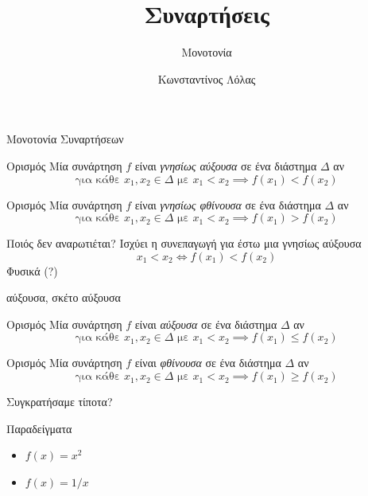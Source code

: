 \documentclass{presentation}
\title{Συναρτήσεις}
\subtitle{Μονοτονία}
\author[Λόλας]{Κωνσταντίνος Λόλας}
\begin{document}
\begin{frame}
  \titlepage
\end{frame}
\begin{frame}{Μονοτονία Συναρτήσεων}
  \begin{block}{Ορισμός}
    Μία συνάρτηση $f$ είναι \emph{γνησίως αύξουσα} σε ένα διάστημα $Δ$ αν
    $$\text{για κάθε } x_1,x_2\in Δ \text{ με } x_1<x_2\implies f(x_1)<f(x_2)$$
  \end{block} \pause
  \begin{block}{Ορισμός}
    Μία συνάρτηση $f$ είναι \emph{γνησίως φθίνουσα} σε ένα διάστημα $Δ$ αν
    $$\text{για κάθε } x_1,x_2\in Δ \text{ με } x_1<x_2\implies f(x_1)>f(x_2)$$
  \end{block}
\end{frame}

\begin{frame}{Ποιός δεν αναρωτιέται?}
  Ισχύει η συνεπαγωγή για έστω μια γνησίως αύξουσα
  $$x_1<x_2\iff f(x_1)<f(x_2)$$
   \pause
  Φυσικά (?)
\end{frame}

\begin{frame}{αύξουσα, σκέτο αύξουσα}
  \begin{block}{Ορισμός}
    Μία συνάρτηση $f$ είναι \emph{αύξουσα} σε ένα διάστημα $Δ$ αν
    $$\text{για κάθε } x_1,x_2\in Δ \text{ με } x_1<x_2\implies f(x_1)\le f(x_2)$$
  \end{block} \pause
  \begin{block}{Ορισμός}
    Μία συνάρτηση $f$ είναι \emph{φθίνουσα} σε ένα διάστημα $Δ$ αν
    $$\text{για κάθε } x_1,x_2\in Δ \text{ με } x_1<x_2\implies f(x_1)\ge f(x_2)$$
  \end{block}
\end{frame}

\begin{frame}{Συγκρατήσαμε τίποτα?}
  \begin{exampleblock}{Παραδείγματα}
    \begin{itemize}
      \item $f(x)=x^2$ \pause
      \item $f(x)=1/x$
    \end{itemize}
  \end{exampleblock}
\end{frame}
\end{document}
